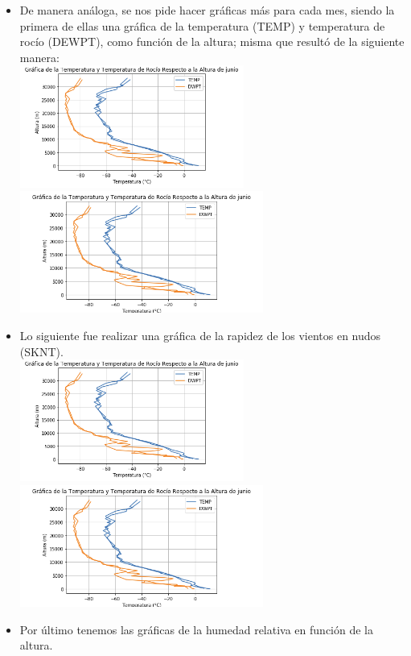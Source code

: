 \documentclass{article}
\begin{document}
\begin{doublespace}
\begin{itemize}
\item De manera análoga, se nos pide hacer gráficas más para cada mes, siendo la primera de ellas una gráfica de la temperatura (TEMP) y temperatura de rocío (DEWPT), como función de la altura; misma que resultó de la siguiente manera:
\\
	\includegraphics[height=4cm]{act312.png}  \hspace*{\fill}
    \includegraphics[height=4cm]{act313.png}
\item Lo siguiente fue realizar una gráfica de la rapidez de los vientos en nudos (SKNT).
\\
	\includegraphics[height=4cm]{act312.png}  \hspace*{\fill}
    \includegraphics[height=4cm]{act313.png}
\item Por último tenemos las gráficas de la humedad relativa en función de la altura.
\\

\end{itemize}
\end{doublespace}
\end{document}
